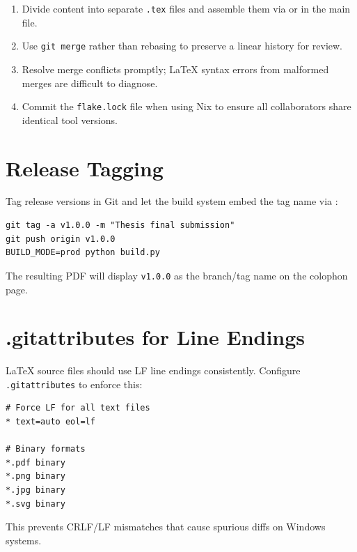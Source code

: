 \begin{enumerate}
  \item Divide content into separate \texttt{.tex} files and assemble
        them via \verb|| or \verb|| in the main file.
  \item Use \texttt{git merge} rather than rebasing to preserve a
        linear history for review.
  \item Resolve merge conflicts promptly; \LaTeX{} syntax errors from
        malformed merges are difficult to diagnose.
  \item Commit the \texttt{flake.lock} file when using Nix to ensure
        all collaborators share identical tool versions.
\end{enumerate}

\section{Release Tagging}

Tag release versions in Git and let the build system embed the tag name
via :

\begin{verbatim}
git tag -a v1.0.0 -m "Thesis final submission"
git push origin v1.0.0
BUILD_MODE=prod python build.py
\end{verbatim}

The resulting PDF will display \texttt{v1.0.0} as the branch/tag name
on the colophon page.

\section{.gitattributes for Line Endings}

LaTeX source files should use LF line endings consistently.  Configure
\texttt{.gitattributes} to enforce this:

\begin{verbatim}
# Force LF for all text files
* text=auto eol=lf

# Binary formats
*.pdf binary
*.png binary
*.jpg binary
*.svg binary
\end{verbatim}

This prevents CRLF/LF mismatches that cause spurious diffs on Windows
systems.
